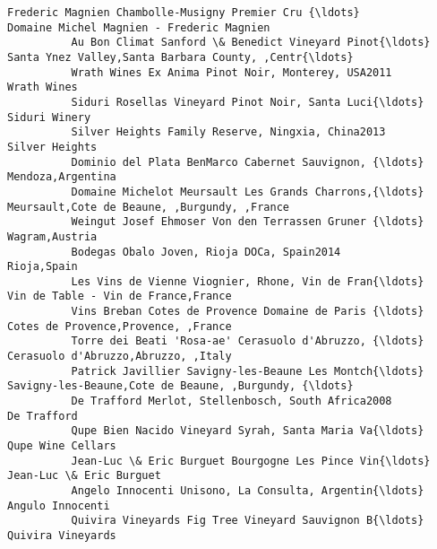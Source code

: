 \documentclass[11pt]{article}
\begin{document}
\begin{Verbatim}[commandchars=\\\{\}]
          Frederic Magnien Chambolle-Musigny Premier Cru {\ldots}          Domaine Michel Magnien - Frederic Magnien   
          Au Bon Climat Sanford \& Benedict Vineyard Pinot{\ldots}  Santa Ynez Valley,Santa Barbara County, ,Centr{\ldots}   
          Wrath Wines Ex Anima Pinot Noir, Monterey, USA2011                                        Wrath Wines   
          Siduri Rosellas Vineyard Pinot Noir, Santa Luci{\ldots}                                      Siduri Winery   
          Silver Heights Family Reserve, Ningxia, China2013                                      Silver Heights   
          Dominio del Plata BenMarco Cabernet Sauvignon, {\ldots}                                  Mendoza,Argentina   
          Domaine Michelot Meursault Les Grands Charrons,{\ldots}       Meursault,Cote de Beaune, ,Burgundy, ,France   
          Weingut Josef Ehmoser Von den Terrassen Gruner {\ldots}                                     Wagram,Austria   
          Bodegas Obalo Joven, Rioja DOCa, Spain2014                                                Rioja,Spain   
          Les Vins de Vienne Viognier, Rhone, Vin de Fran{\ldots}                Vin de Table - Vin de France,France   
          Vins Breban Cotes de Provence Domaine de Paris {\ldots}                Cotes de Provence,Provence, ,France   
          Torre dei Beati 'Rosa-ae' Cerasuolo d'Abruzzo, {\ldots}                Cerasuolo d'Abruzzo,Abruzzo, ,Italy   
          Patrick Javillier Savigny-les-Beaune Les Montch{\ldots}  Savigny-les-Beaune,Cote de Beaune, ,Burgundy, {\ldots}   
          De Trafford Merlot, Stellenbosch, South Africa2008                                        De Trafford   
          Qupe Bien Nacido Vineyard Syrah, Santa Maria Va{\ldots}                                  Qupe Wine Cellars   
          Jean-Luc \& Eric Burguet Bourgogne Les Pince Vin{\ldots}                            Jean-Luc \& Eric Burguet   
          Angelo Innocenti Unisono, La Consulta, Argentin{\ldots}                                   Angulo Innocenti   
          Quivira Vineyards Fig Tree Vineyard Sauvignon B{\ldots}                                  Quivira Vineyards   
          

\end{Verbatim}
\end{document}
